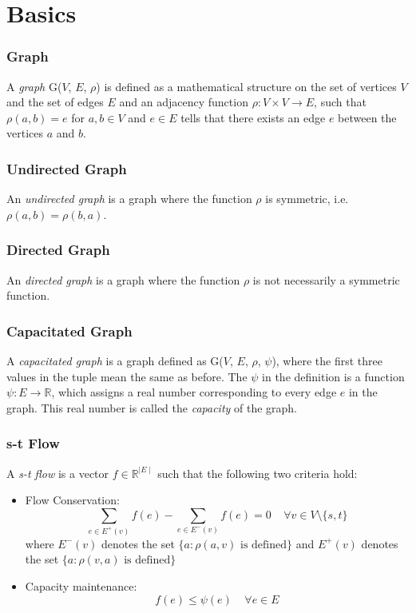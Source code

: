 \documentclass[BTech]{iitmdiss}
\begin{document}
    \section{Basics}
      \subsubsection{Graph}
      A \textit{graph} G($V$, $E$, $\rho$) is defined as a mathematical structure on the set of vertices $V$ and the set of edges $E$ and an adjacency
      function $\rho : V \times V \rightarrow E$, such that $\rho(a,b) = e$ for $a,b \in V$ and $e \in E$ tells that there exists an edge $e$ between 
      the vertices $a$ and $b$.
      
      \subsubsection{Undirected Graph}
	An \textit{undirected graph} is a graph where the function $\rho$ is symmetric, i.e. $\rho(a,b) = \rho(b,a)$.
 
      \subsubsection{Directed Graph}
	An \textit{directed graph} is a graph where the function $\rho$ is not necessarily a symmetric function.
	
      \subsubsection{Capacitated Graph}
	A \textit{capacitated graph} is a graph defined as G($V$, $E$, $\rho$, $\psi$), where the first three values in the tuple mean the same as before.
	The $\psi$ in the definition is a function $\psi: E \rightarrow \mathbb{R}$, which assigns a real number corresponding to every edge $e$ in the 
	graph. This real number is called the \textit{capacity} of the graph.
      
      \subsubsection{s-t Flow}
	A \textit{s-t flow} is a vector $f \in \mathbb{R}^{\mid E \mid}$ such that the following two criteria hold:
	\begin{itemize}
	 \item 
	   Flow Conservation: $$\displaystyle\sum_{e \in E^+(v)} f(e)- \displaystyle\sum_{e \in E^-(v)} f(e) = 0 ~~~~~ \forall v \in V \setminus \{s,t\}$$
	   where $E^-(v)$ denotes the set $\{a: \rho(a,v) \text{ is defined}\}$ and $E^+(v)$ denotes the set $\{a: \rho(v,a) \text{ is defined}\}$
	 \item
	  Capacity maintenance:
	    $$f(e) \leq \psi(e)~~~~~\forall e \in E$$
	      
	\end{itemize}
	
\end{document}
